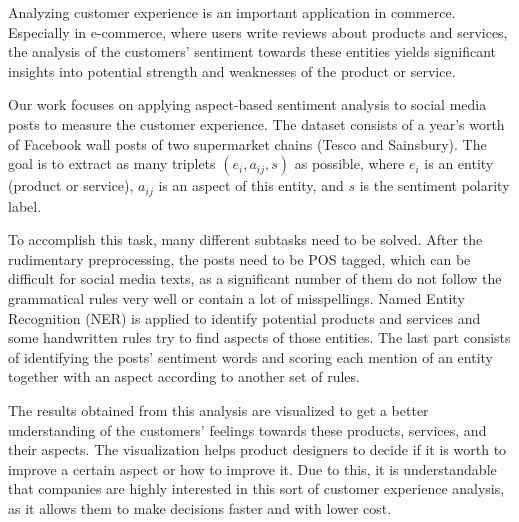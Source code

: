 Analyzing customer experience is an important application in commerce. Especially in e-commerce, where users write reviews about products and services, the analysis of the customers' sentiment towards these entities yields significant insights into potential strength and weaknesses of the product or service.

Our work focuses on applying aspect-based sentiment analysis to social media posts to measure the customer experience. The dataset consists of a year's worth of Facebook wall posts of two supermarket chains (Tesco and Sainsbury). The goal is to extract as many triplets $(e_i, a_{ij}, s)$ as possible, where $e_i$ is an entity (product or service), $a_{ij}$ is an aspect of this entity, and $s$ is the sentiment polarity label.

To accomplish this task, many different subtasks need to be solved. After the rudimentary preprocessing, the posts need to be POS tagged, which can be difficult for social media texts, as a significant number of them do not follow the grammatical rules very well or contain a lot of misspellings. Named Entity Recognition (NER) is applied to identify potential products and services and some handwritten rules try to find aspects of those entities. The last part consists of identifying the posts' sentiment words and scoring each mention of an entity together with an aspect according to another set of rules.

The results obtained from this analysis are visualized to get a better understanding of the customers' feelings towards these products, services, and their aspects. The visualization helps product designers to decide if it is worth to improve a certain aspect or how to improve it. Due to this, it is understandable that companies are highly interested in this sort of customer experience analysis, as it allows them to make decisions faster and with lower cost.